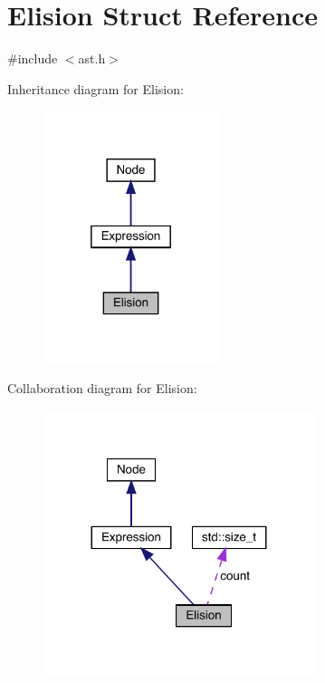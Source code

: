 \hypertarget{struct_elision}{}\section{Elision Struct Reference}
\label{struct_elision}


{\ttfamily \#include $<$ast.\+h$>$}



Inheritance diagram for Elision\+:
\nopagebreak
\begin{figure}[H]
\begin{center}
\leavevmode
\includegraphics[width=145pt]{struct_elision__inherit__graph}
\end{center}
\end{figure}


Collaboration diagram for Elision\+:
\nopagebreak
\begin{figure}[H]
\begin{center}
\leavevmode
\includegraphics[width=224pt]{struct_elision__coll__graph}
\end{center}
\end{figure}
